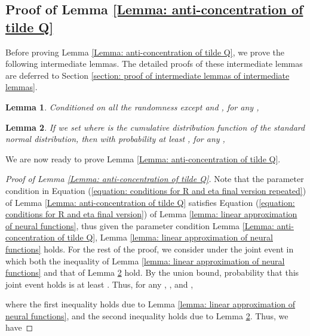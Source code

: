 \documentclass{article} \usepackage{iclr2023/iclr2023_conference,times}
\newtheorem{lemma}{Lemma}[section]
\begin{document}
\subsection{Proof of Lemma \ref{Lemma: anti-concentration of tilde Q}}

Before proving Lemma \ref{Lemma: anti-concentration of tilde Q}, we prove the following intermediate lemmas. The detailed proofs of these intermediate lemmas are deferred to Section \ref{section: proof of intermediate lemmas of intermediate lemmas}. 

\begin{lemma}
Conditioned on all the randomness except  and , for any ,

\label{Lemma: perturbed ERM minus non-perturbed ERM follows a Gaussian}
\end{lemma}



\begin{lemma}
If we set  where  is the cumulative distribution function of the standard normal distribution, then with probability at least , for any ,  

\label{lemma: anti-concentration for proxy linear MDP}
\end{lemma}


We are now ready to prove Lemma \ref{Lemma: anti-concentration of tilde Q}. 
\begin{proof}[Proof of Lemma \ref{Lemma: anti-concentration of tilde Q}]
Note that the parameter condition in Equation (\ref{equation: conditions for R and eta final version repeated}) of Lemma \ref{Lemma: anti-concentration of tilde Q} satisfies Equation (\ref{equation: conditions for R and eta final version}) of Lemma \ref{lemma: linear approximation of neural functions}, thus given the parameter condition Lemma \ref{Lemma: anti-concentration of tilde Q}, Lemma \ref{lemma: linear approximation of neural functions} holds. For the rest of the proof, we consider under the joint event in which both the inequality of Lemma \ref{lemma: linear approximation of neural functions} and that of Lemma \ref{lemma: anti-concentration for proxy linear MDP} hold. By the union bound, probability that this joint event holds is at least . Thus, for any , , and , 


where the first inequality holds due to Lemma \ref{lemma: linear approximation of neural functions}, and the second inequality holds due to Lemma \ref{lemma: anti-concentration for proxy linear MDP}. Thus, we have 




\end{proof}
\end{document}
